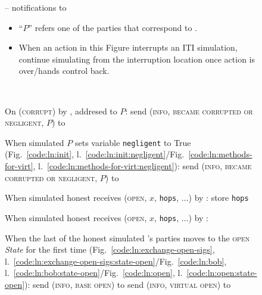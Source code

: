 \begin{figure}[H]
  \begin{simulatorbox}{\simulator{} -- notifications to \fchan}
    \begin{itemize}
      \item ``$P$'' refers one of the parties that correspond to \fchan.
      \item When an action in this Figure interrupts an ITI simulation, continue
      simulating from the interruption location once action is over/\fchan hands
      control back.
    \end{itemize} \ \\
    \begin{algorithmic}[1]
      \State On (\textsc{corrupt}) by \adversary, addresed to $P$:
      \label{code:simulator:when-corrupted}
      \Indent
        \State {}
        \State send (\textsc{info}, \textsc{became corrupted or negligent}, $P$)
        to \fchan
        \label{code:simulator:corrupted}
      \EndIndent
      \Statex

      \State When simulated $P$ sets variable \texttt{negligent} to True
      (Fig.~\ref{code:ln:init},
      l.~\ref{code:ln:init:negligent}/Fig.~\ref{code:ln:methods-for-virt},
      l.~\ref{code:ln:methods-for-virt:negligent}):
      \label{code:simulator:when-negligent}
      \Indent
        \State send (\textsc{info}, \textsc{became corrupted or negligent}, $P$)
        to \fchan
        \label{code:simulator:negligent}
      \EndIndent
      \Statex

      \State When simulated honest \alice receives (\textsc{open}, $x$,
      \texttt{hops}, $\dots$) by \environment:
      \Indent
        \State store \texttt{hops} 
      \EndIndent
      \Statex

      \State When simulated honest \bob receives (\textsc{open}, $x$,
      \texttt{hops}, $\dots$) by \alice:
      \Indent
         
      \EndIndent
      \Statex

      \State When the last of the honest simulated \fchan's parties moves to the
      \textsc{open} \textit{State} for the first time
      (Fig.~\ref{code:ln:exchange-open-sigs},
      l.~\ref{code:ln:exchange-open-sigs:state-open}/Fig.~\ref{code:ln:bob},
      l.~\ref{code:ln:bob:state-open}/Fig.~\ref{code:ln:open},
      l.~\ref{code:ln:open:state-open}):
      \label{code:simulator:when-open}
      \Indent
          \State send (\textsc{info}, \textsc{base open}) to \fchan
          \label{code:simulator:base-open}
        \Else
          \State send (\textsc{info}, \textsc{virtual open}) to \fchan
          \label{code:simulator:virtual-open}
        \EndIf
      \EndIndent
      \Statex


\end{algorithmic}
\end{simulatorbox}
\end{figure}
